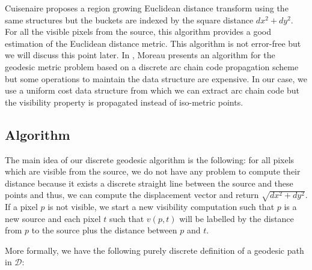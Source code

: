 \documentclass[fleqn,twoside]{article}
\begin{document}



Cuisenaire \cite{cuisenaire} proposes  a region growing Euclidean
distance transform using  the   same  structures but the   buckets  are
indexed  by  the square  distance $dx^2+dy^2$.   For  all  the visible
pixels from  the source, this algorithm  provides a good estimation of
the Euclidean distance metric. This algorithm is not error-free but we
will discuss this point later.
In \cite{moreau,moreauRR}, Moreau  presents  an  algorithm  for the
geodesic metric problem based on a discrete arc chain code propagation
scheme but   some  operations  to   maintain the  data  structure  are
expensive. In our   case, we use a uniform   cost data structure  from
which we can  extract arc chain code but   the visibility property  is
propagated instead of iso-metric points.




\subsection{Algorithm}

The main idea of our discrete geodesic algorithm is the following: for
all pixels which are  visible  from the source,  we  do not  have  any
problem   to compute their   distance  because  it  exists  a discrete
straight  line between the source  and these points   and thus, we can
compute the displacement  vector and  return $\sqrt{dx^2+dy^2}$. If  a
pixel $p$  is not visible, we  start a new visibility computation such
that $p$ is a new source and each pixel $t$ such that $v(p,t)$ will be
labelled by  the  distance from  $p$  to the source  plus the distance
between $p$ and $t$.

More formally, we have the following purely discrete definition of a geodesic path in $\mathcal{D}$:
\end{document}
